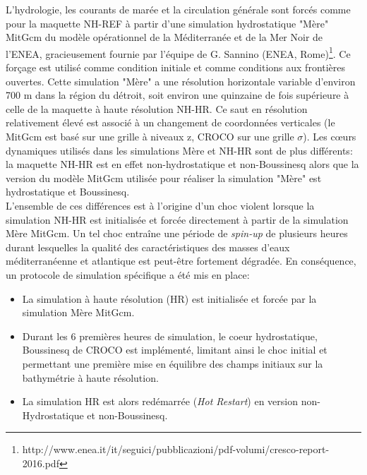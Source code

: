 L'hydrologie, les courants de marée et la circulation générale sont forcés comme pour la maquette NH-REF à partir d'une simulation hydrostatique "Mère" MitGcm du modèle opérationnel de la Méditerranée et de la Mer Noir de l'ENEA, gracieusement fournie par l'équipe de G. Sannino (ENEA, Rome)\footnote{http://www.enea.it/it/seguici/pubblicazioni/pdf-volumi/cresco-report-2016.pdf}. Ce forçage est utilisé comme condition initiale et comme conditions aux frontières ouvertes. Cette simulation "Mère" a une résolution horizontale variable d'environ 700 m dans la région du détroit, soit environ une quinzaine de fois supérieure à celle de la maquette à haute résolution NH-HR. Ce saut en résolution relativement élevé est associé à un changement de coordonnées verticales (le MitGcm est basé sur une grille à niveaux z, CROCO sur une grille $\sigma$).  Les cœurs dynamiques utilisés dans les simulations Mère et NH-HR sont de plus différents: la maquette NH-HR est en effet non-hydrostatique et non-Boussinesq alors que la version du modèle MitGcm utilisée pour réaliser la simulation "Mère" est hydrostatique et Boussinesq.\\
L'ensemble de ces différences est à l'origine d'un choc violent lorsque la simulation NH-HR est initialisée et forcée directement à partir de la simulation Mère MitGcm. Un tel choc entraîne une période de \textit{spin-up} de plusieurs heures durant lesquelles la qualité des caractéristiques des masses d'eaux méditerranéenne et atlantique est peut-être fortement dégradée. En conséquence, un protocole de simulation spécifique a été mis en place:
\begin{itemize}
        \item La simulation à haute résolution (HR) est initialisée et forcée par la simulation Mère MitGcm.
        \item Durant les 6 premières heures de simulation, le coeur hydrostatique, Boussinesq de CROCO est implémenté, limitant ainsi le choc initial et permettant une première mise en équilibre des champs initiaux sur la bathymétrie à haute résolution.
        \item La simulation HR est alors redémarrée (\textit{Hot Restart}) en version non-Hydrostatique et non-Boussinesq.
\end{itemize}


